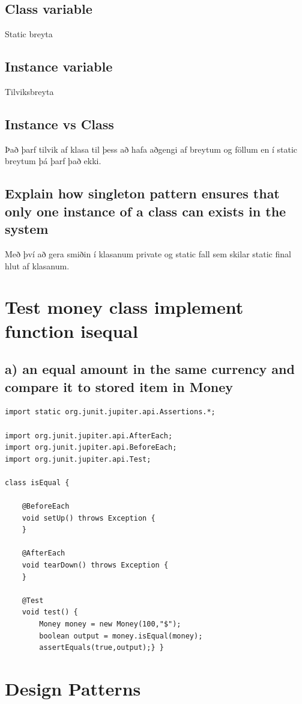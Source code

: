 \documentclass[openany]{article}
\begin{document}
\subsection{Class variable}
Static breyta
\subsection{Instance variable}
Tilviksbreyta
\subsection{Instance vs Class}
Það þarf tilvik af klasa til þess að hafa aðgengi af breytum og föllum en í static breytum þá þarf það ekki.
\subsection{Explain how singleton pattern ensures that only one instance of a class can exists in the system}
Með því að gera smiðin í klasanum private og static fall sem skilar static final hlut af klasanum.

\section{Test money class implement function isequal}
\subsection{a) an equal amount in the same currency and compare it to stored item in Money}
\begin{lstlisting}
import static org.junit.jupiter.api.Assertions.*;

import org.junit.jupiter.api.AfterEach;
import org.junit.jupiter.api.BeforeEach;
import org.junit.jupiter.api.Test;

class isEqual {

	@BeforeEach
	void setUp() throws Exception {
	}

	@AfterEach
	void tearDown() throws Exception {
	}

	@Test
	void test() {
		Money money = new Money(100,"$");
		boolean output = money.isEqual(money);
		assertEquals(true,output);} }
\end{lstlisting}


\section{Design Patterns}
\end{document}
